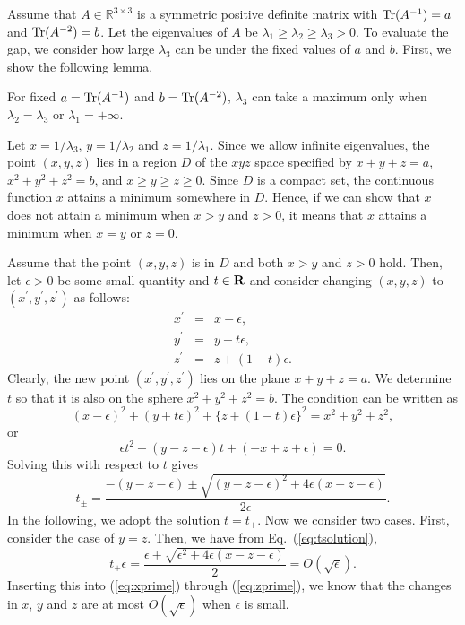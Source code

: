 \documentclass{amsart}
\begin{document}
Assume that $A\in{\mathbb R}^{3\times 3}$ is a symmetric positive definite matrix with ${\rm Tr}(A^{-1})=a$ and ${\rm Tr}(A^{-2})=b$. Let the eigenvalues of $A$ be $\lambda_1\ge \lambda_2\ge \lambda_3>0$. To evaluate the gap, we consider how large $\lambda_3$ can be under the fixed values of $a$ and $b$. First, we show the following lemma.
\begin{Lem}
\label{Lem2}
For fixed $a={\rm Tr}(A^{-1}) $ and $b={\rm Tr}(A^{-2})$, $\lambda_3$ can take a maximum only when $\lambda_2=\lambda_3$ or $\lambda_1=+\infty$.
\end{Lem}
\proof
Let $x=1/\lambda_3$, $y=1/\lambda_2$ and $z=1/\lambda_1$. Since we allow infinite eigenvalues, the point $(x, y, z)$ lies in a region $D$ of the $xyz$ space specified by $x+y+z=a$, $x^2+y^2+z^2=b$, and $x\ge y\ge z\ge 0$. Since $D$ is a compact set, the continuous function $x$ attains a minimum somewhere in $D$. Hence, if we can show that $x$ does not attain a minimum when $x>y$ and $z>0$, it means that $x$ attains a minimum when $x=y$ or $z=0$.

Assume that the point $(x,y,z)$ is in $D$ and both $x>y$ and $z>0$ hold. Then, let $\epsilon>0$ be some small quantity and $t\in{\bf R}$ and consider changing $(x,y,z)$ to $(x^{\prime}, y^{\prime}, z^{\prime})$ as follows:
\begin{eqnarray}
x^{\prime} &=& x - \epsilon, \label{eq:xprime} \\
y^{\prime} &=& y + t\epsilon, \label{eq:yprime} \\
z^{\prime} &=& z + (1-t)\epsilon. \label{eq:zprime} 
\end{eqnarray}
Clearly, the new point $(x^{\prime}, y^{\prime}, z^{\prime})$ lies on the plane $x+y+z=a$. We determine $t$ so that it is also on the sphere $x^2+y^2+z^2=b$. The condition can be written as
\begin{equation}
(x-\epsilon)^2 + (y+t\epsilon)^2 + \{z+(1-t)\epsilon\}^2 = x^2+y^2+z^2,
\end{equation}
or
\begin{equation}
\epsilon t^2 + (y-z-\epsilon)t + (-x+z+\epsilon)=0.
\end{equation}
Solving this with respect to $t$ gives
\begin{equation}
t_{\pm}= \frac{-(y-z-\epsilon)\pm\sqrt{(y-z-\epsilon)^2+4\epsilon(x-z-\epsilon)}}{2\epsilon}.
\label{eq:tsolution}
\end{equation}
In the following, we adopt the solution $t=t_+$. Now we consider two cases. First, consider the case of $y=z$. Then, we have from Eq.~(\ref{eq:tsolution}),
\begin{equation}
t_+\epsilon = \frac{\epsilon+\sqrt{\epsilon^2+4\epsilon(x-z-\epsilon)}}{2} = O(\sqrt{\epsilon}).
\end{equation}
Inserting this into (\ref{eq:xprime}) through (\ref{eq:zprime}), we know that the changes in $x$, $y$ and $z$ are at most $O(\sqrt{\epsilon})$ when $\epsilon$ is small.
\end{document}
